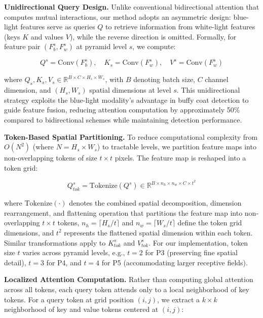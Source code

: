 \textbf{Unidirectional Query Design.} Unlike conventional bidirectional attention that computes mutual interactions, our method adopts an asymmetric design: blue-light features serve as queries $Q$ to retrieve information from white-light features (keys $K$ and values $V$), while the reverse direction is omitted. Formally, for feature pair $(F_b^s, F_w^s)$ at pyramid level $s$, we compute:

\begin{equation}
Q^s = \text{Conv}(F_b^s), \quad K_s = \text{Conv}(F_w^s), \quad V^s = \text{Conv}(F_w^s)
\end{equation}

where $Q_s, K_s, V_s \in \mathbb{R}^{B \times C \times H_s \times W_s}$, with $B$ denoting batch size, $C$ channel dimension, and $(H_s, W_s)$ spatial dimensions at level $s$. This unidirectional strategy exploits the blue-light modality's advantage in buffy coat detection to guide feature fusion, reducing attention computation by approximately 50\% compared to bidirectional schemes while maintaining detection performance.

\textbf{Token-Based Spatial Partitioning.} To reduce computational complexity from $O(N^2)$ (where $N = H_s \times W_s$) to tractable levels, we partition feature maps into non-overlapping tokens of size $t \times t$ pixels. The feature map is reshaped into a token grid:

\begin{equation}
Q^s_{tok} = \text{Tokenize}(Q^s) \in \mathbb{R}^{B \times n_h \times n_w \times C \times t^2}
\end{equation}

where $\text{Tokenize}(\cdot)$ denotes the combined spatial decomposition, dimension rearrangement, and flattening operation that partitions the feature map into non-overlapping $t \times t$ tokens, $n_h = \lceil H_s / t \rceil$ and $n_w = \lceil W_s / t \rceil$ define the token grid dimensions, and $t^2$ represents the flattened spatial dimension within each token. Similar transformations apply to $K^s_{tok}$ and $V^s_{tok}$. For our implementation, token size $t$ varies across pyramid levels, e.g., $t=2$ for P3 (preserving fine spatial detail), $t=3$ for P4, and $t=4$ for P5 (accommodating larger receptive fields).

\textbf{Localized Attention Computation.} Rather than computing global attention across all tokens, each query token attends only to a local neighborhood of key tokens. For a query token at grid position $(i, j)$, we extract a $k \times k$ neighborhood of key and value tokens centered at $(i, j)$:

